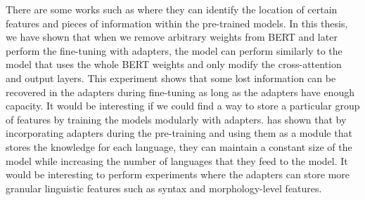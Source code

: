 There are some works such as  where they can identify the location of certain features and pieces of information within the pre-trained models. In this thesis, we have shown that when we remove arbitrary weights from BERT and later perform the fine-tuning with adapters, the model can perform similarly to the model that uses the whole BERT weights and only modify the cross-attention and output layers. This experiment shows that some lost information can be recovered in the adapters during fine-tuning as long as the adapters have enough capacity. It would be interesting if we could find a way to store a particular group of features by training the models modularly with adapters.  has shown that by incorporating adapters during the pre-training and using them as a module that stores the knowledge for each language, they can maintain a constant size of the model while increasing the number of languages that they feed to the model. It would be interesting to perform experiments where the adapters can store more granular linguistic features such as syntax and morphology-level features.